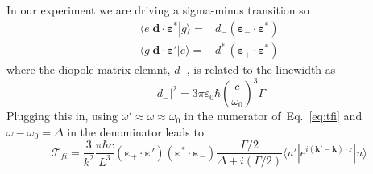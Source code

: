 \documentclass[11pt,letter]{article}
\newcommand{\bv}[1]{\ensuremath{\bm{#1}}}
\begin{document}
In our experiment we are driving a sigma-minus transition so
\begin{equation}
\begin{split} 
     \langle e | \bv{d} \cdot \bv{\varepsilon}^{*} | g \rangle  = & 
     d_{-} (\bv{\varepsilon}_{-}  \cdot \bv{\varepsilon}^{*} ) \\ 
     \langle g | \bv{d} \cdot \bv{\varepsilon}' | e \rangle  = & 
     d_{-}^{*} (\bv{\varepsilon}_{+}  \cdot \bv{\varepsilon}^{*} )
\end{split} 
\end{equation}
where the diopole matrix elemnt, $d_{-}$, is related to the linewidth as 
\begin{equation} 
    |d_{-}|^{2} =  3\pi \varepsilon_{0} \hbar
  \left( \frac{c}{\omega_{0}} \right)^{3}  \Gamma
\end{equation}
Plugging this in,  using $\omega' \approx \omega \approx \omega_{0}$ in the
numerator of~Eq.~\ref{eq:tfi} and $\omega-\omega_{0}=\Delta$ in the denominator
leads to 
\begin{equation}
    \mathcal{T}_{fi} =
    \frac{ 3 } {k^{2}} 
    \frac{ \pi \hbar c } {  L^{3} } 
        (\bv{\varepsilon}_{+}\cdot \bv{\varepsilon}' )
                       (\bv{\varepsilon}^{*}\cdot \bv{\varepsilon}_{-} )
    \frac{ \Gamma/2  }
        { \Delta + i (\Gamma/2 ) }
      \langle u' | e^{i(\bv{k}'-\bv{k}) \cdot\bv{r}} | u  \rangle
\end{equation}

 
%
\end{document}
